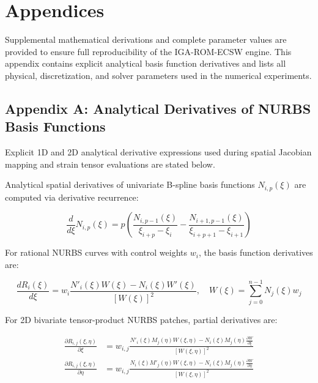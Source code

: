 \chapter*{Appendices}

Supplemental mathematical derivations and complete parameter values are provided to ensure full reproducibility of the IGA-ROM-ECSW engine. This appendix contains explicit analytical basis function derivatives and lists all physical, discretization, and solver parameters used in the numerical experiments.

\section*{Appendix A: Analytical Derivatives of NURBS Basis Functions}
\label{sec:appendix_nurbs_derivatives}

Explicit 1D and 2D analytical derivative expressions used during spatial Jacobian mapping and strain tensor evaluations are stated below.

Analytical spatial derivatives of univariate B-spline basis functions $N_{i,p}(\xi)$ are computed via derivative recurrence:

\begin{equation}
    \frac{d}{d\xi} N_{i,p}(\xi) = p \left( \frac{N_{i,p-1}(\xi)}{\xi_{i+p} - \xi_i} - \frac{N_{i+1,p-1}(\xi)}{\xi_{i+p+1} - \xi_{i+1}} \right)
\end{equation}

For rational NURBS curves with control weights $w_i$, the basis function derivatives are:

\begin{equation}
    \frac{d R_i(\xi)}{d\xi} = w_i \frac{N'_i(\xi) W(\xi) - N_i(\xi) W'(\xi)}{[W(\xi)]^2}, \quad W(\xi) = \sum_{j=0}^{n-1} N_j(\xi) w_j
\end{equation}

For 2D bivariate tensor-product NURBS patches, partial derivatives are:

\begin{align}
    \frac{\partial R_{i,j}(\xi, \eta)}{\partial \xi} &= w_{i,j} \frac{N'_i(\xi) M_j(\eta) W(\xi, \eta) - N_i(\xi) M_j(\eta) \frac{\partial W}{\partial \xi}}{[W(\xi, \eta)]^2} \\
    \frac{\partial R_{i,j}(\xi, \eta)}{\partial \eta} &= w_{i,j} \frac{N_i(\xi) M'_j(\eta) W(\xi, \eta) - N_i(\xi) M_j(\eta) \frac{\partial W}{\partial \eta}}{[W(\xi, \eta)]^2}
\end{align}

